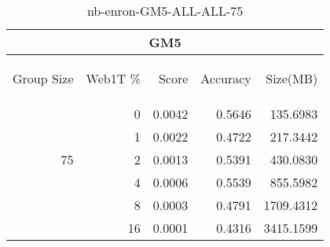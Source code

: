\begin{center}
\begin{table}[htbp] 
 \begin{center}
\begin{tabular}{ | r | r | r | r | r |}
\hline
\multicolumn{5}{|c|}{GM5}\\
\hline
\begin{sideways}Group Size\end{sideways} & \begin{sideways}Web1T \%\end{sideways} & \begin{sideways}Score\end{sideways} & \begin{sideways}Accuracy\end{sideways} & \begin{sideways}Size(MB)\end{sideways}\\
\hline
\multirow{5}{*}{75}
 & 0 & 0.0042 & 0.5646 & 135.6983\\ \cline{2-5}
 & 1 & 0.0022 & 0.4722 & 217.3442\\ \cline{2-5}
 & 2 & 0.0013 & 0.5391 & 430.0830\\ \cline{2-5}
 & 4 & 0.0006 & 0.5539 & 855.5982\\ \cline{2-5}
 & 8 & 0.0003 & 0.4791 & 1709.4312\\ \cline{2-5}
 & 16 & 0.0001 & 0.4316 & 3415.1599\\ \cline{2-5}
\hline
\end{tabular}
\caption{nb-enron-GM5-ALL-ALL-75}
\label{table:nb-enron-GM5-ALL-ALL-75}
\end{center}
 \end{table}
\end{center}

